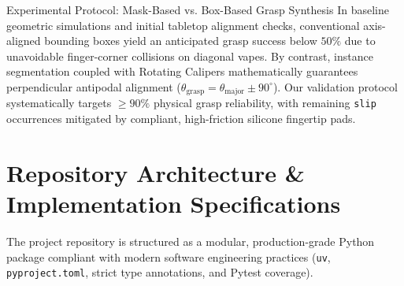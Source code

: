 \documentclass[10pt,a4paper]{article}
\begin{document}
\begin{calloutbox}[top=1.0mm, bottom=1.0mm]{Experimental Protocol: Mask-Based vs. Box-Based Grasp Synthesis}
In baseline geometric simulations and initial tabletop alignment checks, conventional axis-aligned bounding boxes yield an anticipated grasp success below $50\%$ due to unavoidable finger-corner collisions on diagonal vapes. By contrast, instance segmentation coupled with Rotating Calipers mathematically guarantees perpendicular antipodal alignment ($\theta_{\text{grasp}} = \theta_{\text{major}} \pm 90^\circ$). Our validation protocol systematically targets $\ge 90\%$ physical grasp reliability, with remaining \texttt{slip} occurrences mitigated by compliant, high-friction silicone fingertip pads.
\end{calloutbox}
\vspace{-0.25em}

\section{Repository Architecture \& Implementation Specifications}
The project repository is structured as a modular, production-grade Python package compliant with modern software engineering practices (\texttt{uv}, \texttt{pyproject.toml}, strict type annotations, and Pytest coverage).
\end{document}
